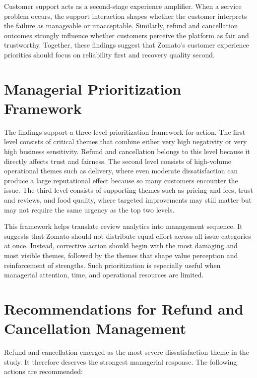 Customer support acts as a second-stage experience amplifier. When a service problem occurs, the support interaction shapes whether the customer interprets the failure as manageable or unacceptable. Similarly, refund and cancellation outcomes strongly influence whether customers perceive the platform as fair and trustworthy. Together, these findings suggest that Zomato's customer experience priorities should focus on reliability first and recovery quality second.

\section{Managerial Prioritization Framework}

The findings support a three-level prioritization framework for action. The first level consists of critical themes that combine either very high negativity or very high business sensitivity. Refund and cancellation belongs to this level because it directly affects trust and fairness. The second level consists of high-volume operational themes such as delivery, where even moderate dissatisfaction can produce a large reputational effect because so many customers encounter the issue. The third level consists of supporting themes such as pricing and fees, trust and reviews, and food quality, where targeted improvements may still matter but may not require the same urgency as the top two levels.

This framework helps translate review analytics into management sequence. It suggests that Zomato should not distribute equal effort across all issue categories at once. Instead, corrective action should begin with the most damaging and most visible themes, followed by the themes that shape value perception and reinforcement of strengths. Such prioritization is especially useful when managerial attention, time, and operational resources are limited.

\section{Recommendations for Refund and Cancellation Management}

Refund and cancellation emerged as the most severe dissatisfaction theme in the study. It therefore deserves the strongest managerial response. The following actions are recommended:

